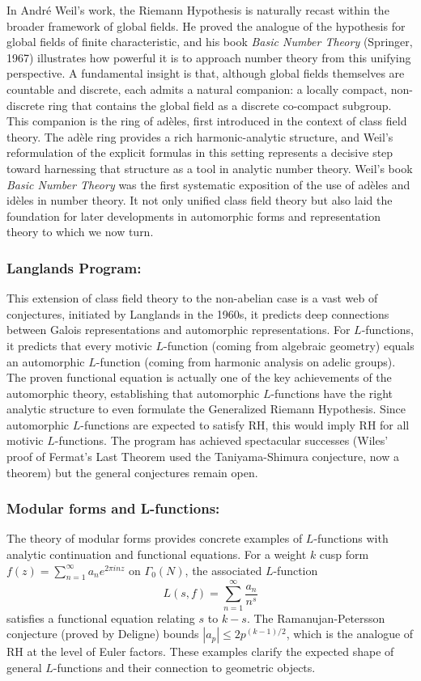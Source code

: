 \documentclass{article}
\begin{document}
In Andr\'e Weil’s work, the Riemann Hypothesis is naturally recast within the broader framework of global fields. He proved the analogue of the hypothesis for global fields of finite characteristic, and his book \emph{Basic Number Theory} (Springer, 1967) illustrates how powerful it is to approach number theory from this unifying perspective. A fundamental insight is that, although global fields themselves are countable and discrete, each admits a natural companion: a locally compact, non-discrete ring that contains the global field as a discrete co-compact subgroup. This companion is the ring of ad\`eles, first introduced in the context of class field theory. The ad\`ele ring provides a rich harmonic-analytic structure, and Weil’s reformulation of the explicit formulas in this setting represents a decisive step toward harnessing that structure as a tool in analytic number theory. Weil’s book \emph{Basic Number Theory}  was the first systematic exposition of the use of ad\`eles and id\`eles in number theory. It not only unified class field theory but also laid the foundation for later developments in automorphic forms and representation theory to which we now turn. 



\subsubsection{Langlands Program:} This extension of class field theory to the non-abelian case is a vast web of conjectures, initiated by Langlands in the 1960s, it predicts deep connections between Galois representations and automorphic representations. For $L$-functions, it predicts that every motivic $L$-function (coming from algebraic geometry) equals an automorphic $L$-function (coming from harmonic analysis on adelic groups). The proven functional equation is actually one of the key achievements of the automorphic theory, establishing that automorphic $L$-functions have the right analytic structure to even formulate the Generalized Riemann Hypothesis. Since automorphic $L$-functions are expected to satisfy  RH, this would imply RH for all motivic $L$-functions. The program has achieved spectacular successes (Wiles' proof of Fermat's Last Theorem used the Taniyama-Shimura conjecture, now a theorem) but the general conjectures remain open.

   \subsubsection{Modular forms and L-functions:} The theory of modular forms provides concrete examples of $L$-functions with analytic continuation and functional equations. For a weight $k$ cusp form $f(z) = \sum_{n=1}^{\infty} a_n e^{2\pi i nz}$ on $\Gamma_0(N)$, the associated $L$-function
    \[
    L(s,f) = \sum_{n=1}^{\infty} \frac{a_n}{n^s}
    \]
    satisfies a functional equation relating $s$ to $k-s$. The Ramanujan-Petersson conjecture (proved by Deligne) bounds $|a_p| \leq 2p^{(k-1)/2}$, which is the analogue of RH at the level of Euler factors. These examples clarify the expected shape of general $L$-functions and their connection to geometric objects.
\end{document}
